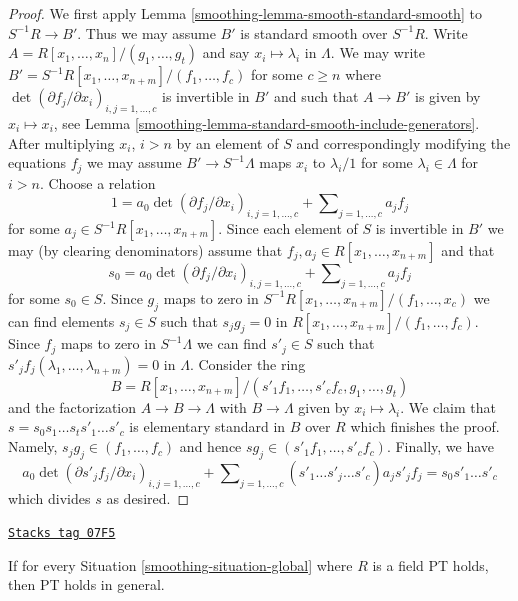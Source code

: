 \begin{proof}

We first apply Lemma \ref{smoothing-lemma-smooth-standard-smooth} to $S^{-1}R \to B'$.
Thus we may assume $B'$ is standard smooth over $S^{-1}R$.
Write $A = R[x_1, \ldots, x_n]/(g_1, \ldots, g_t)$ and say
$x_i \mapsto \lambda_i$ in $\Lambda$. We may write
$B' = S^{-1}R[x_1, \ldots, x_{n + m}]/(f_1, \ldots, f_c)$
for some $c \geq n$ where
$\det(\partial f_j/\partial x_i)_{i, j = 1, \ldots, c}$
is invertible in $B'$ and such that $A \to B'$ is given by $x_i \mapsto x_i$,
see Lemma \ref{smoothing-lemma-standard-smooth-include-generators}.
After multiplying $x_i$, $i > n$ by an element of $S$ and correspondingly
modifying the equations $f_j$ we may assume $B' \to S^{-1}\Lambda$ maps
$x_i$ to $\lambda_i/1$ for some $\lambda_i \in \Lambda$ for $i > n$.
Choose a relation
$$
1 =
a_0 \det(\partial f_j/\partial x_i)_{i, j = 1, \ldots, c}
+
\sum\nolimits_{j = 1, \ldots, c} a_jf_j
$$
for some $a_j \in S^{-1}R[x_1, \ldots, x_{n + m}]$. Since each element of $S$
is invertible in $B'$ we may (by clearing denominators) assume that
$f_j, a_j \in R[x_1, \ldots, x_{n + m}]$ and that
$$
s_0 = a_0 \det(\partial f_j/\partial x_i)_{i, j = 1, \ldots, c}
+
\sum\nolimits_{j = 1, \ldots, c} a_jf_j
$$
for some $s_0 \in S$. Since $g_j$ maps to zero in
$S^{-1}R[x_1, \ldots, x_{n + m}]/(f_1, \ldots, x_c)$
we can find elements $s_j \in S$ such that $s_j g_j = 0$ in
$R[x_1, \ldots, x_{n + m}]/(f_1, \ldots, f_c)$.
Since $f_j$ maps to zero in $S^{-1}\Lambda$ we can find $s'_j \in S$
such that $s'_j f_j(\lambda_1, \ldots, \lambda_{n + m}) = 0$ in
$\Lambda$. Consider the ring
$$
B = R[x_1, \ldots, x_{n + m}]/
(s'_1f_1, \ldots, s'_cf_c, g_1, \ldots, g_t)
$$
and the factorization $A \to B \to \Lambda$ with $B \to \Lambda$ given by
$x_i \mapsto \lambda_i$. We claim that $s = s_0s_1 \ldots s_ts'_1 \ldots s'_c$
is elementary standard in $B$ over $R$ which finishes the proof.
Namely, $s_j g_j \in (f_1, \ldots, f_c)$ and hence
$sg_j \in (s'_1f_1, \ldots, s'_cf_c)$. Finally, we have
$$
a_0\det(\partial s'_jf_j/\partial x_i)_{i, j = 1, \ldots, c}
+
\sum\nolimits_{j = 1, \ldots, c}
(s'_1 \ldots \hat{s'_j} \ldots s'_c) a_j s'_jf_j
=
s_0s'_1\ldots s'_c
$$
which divides $s$ as desired.
\end{proof}

\begin{lemma}
\label{smoothing-lemma-reduce-to-field}
\href{https://stacks.math.columbia.edu/tag/07F5}{\texttt{Stacks tag 07F5}}


If for every Situation \ref{smoothing-situation-global} where $R$
is a field PT holds, then PT holds in general.
\end{lemma}


